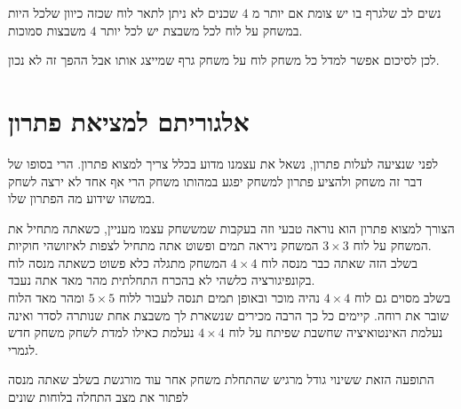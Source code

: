 \documentclass[12pt,twoside]{article}
\begin{document}
נשים לב שלגרף בו יש צומת אם יותר מ
$4$
שכנים לא ניתן לתאר לוח שכזה כיוון שלכל היות במשחק על לוח
לכל משבצת יש לכל יותר 
$4$
משבצות סמוכות.

לכן לסיכום אפשר למדל כל משחק לוח על משחק גרף שמייצג אותו אבל 
ההפך זה לא נכון.

\newpage

\section{ אלגוריתם למציאת פתרון}
לפני שנציעה לעלות פתרון, נשאל את עצמנו מדוע בכלל צריך למצוא פתרון.
הרי בסופו של דבר זה משחק ולהציע פתרון למשחק יפגע במהותו משחק הרי אף אחד לא ירצה
לשחק במשהו שידוע מה הפתרון שלו.

הצורך למצוא פתרון הוא נוראה טבעי וזה בעקבות שמששחק עצמו מעניין, כשאתה מתחיל 
את המשחק על לוח 
$3 \times 3$
המשחק ניראה תמים ופשוט אתה מתחיל לצפות לאיזושהי חוקיות.
\\
בשלב הזה שאתה כבר מנסה לוח 
$4 \times 4$
המשחק מתגלה כלא פשוט כשאתה מנסה לוח בקונפיגורציה כלשהי לא בהכרח התחלתית
מהר מאד אתה נעבד.
\\
בשלב מסוים גם לוח 
$4 \times 4$
נהיה מוכר ובאופן תמים תנסה לעבור ללוח
$5 \times 5$
ומהר מאד הלוח שובר את רוחה.
קיימים כל כך הרבה מכירים שנשארת לך משבצת אחת שנותרה לסדר ואינה נעלמת
האינטואיציה שחשבת שפיתח על לוח 
$4 \times 4$
נעלמת כאילו למדת לשחק משחק חדש לגמרי.

התופעה הזאת ששינוי גודל מרגיש שהתחלת משחק אחר עוד
מורגשת בשלב שאתה מנסה לפתור את מצב התחלה בלוחות שונים
\end{document}
